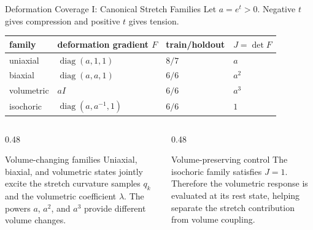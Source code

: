 \documentclass[aspectratio=169,10pt]{beamer}
\begin{document}
\begin{frame}{Deformation Coverage I: Canonical Stretch Families}
  \small
  Let $a=e^t>0$. Negative $t$ gives compression and positive $t$ gives
  tension.
  \begin{table}
    \centering
    \renewcommand{\arraystretch}{1.45}
    \begin{tabular}{llll}
      \toprule
      family & deformation gradient $F$ & train/holdout & $J=\det F$ \\
      \midrule
      uniaxial
        & $\operatorname{diag}(a,1,1)$
        & $8/7$ & $a$ \\
      biaxial
        & $\operatorname{diag}(a,a,1)$
        & $6/6$ & $a^2$ \\
      volumetric
        & $aI$
        & $6/6$ & $a^3$ \\
      isochoric
        & $\operatorname{diag}(a,a^{-1},1)$
        & $6/6$ & $1$ \\
      \bottomrule
    \end{tabular}
  \end{table}

  \vspace{0.8em}
  \begin{columns}[T]
    \begin{column}{0.48\linewidth}
      \begin{block}{Volume-changing families}
        Uniaxial, biaxial, and volumetric states jointly excite the stretch
        curvature samples $q_k$ and the volumetric coefficient $\lambda$.
        The powers $a$, $a^2$, and $a^3$ provide different volume changes.
      \end{block}
    \end{column}
    \begin{column}{0.48\linewidth}
      \begin{block}{Volume-preserving control}
        The isochoric family satisfies $J=1$. Therefore the volumetric
        response is evaluated at its rest state, helping separate the stretch
        contribution from volume coupling.
      \end{block}
    \end{column}
  \end{columns}
\end{frame}
\end{document}
